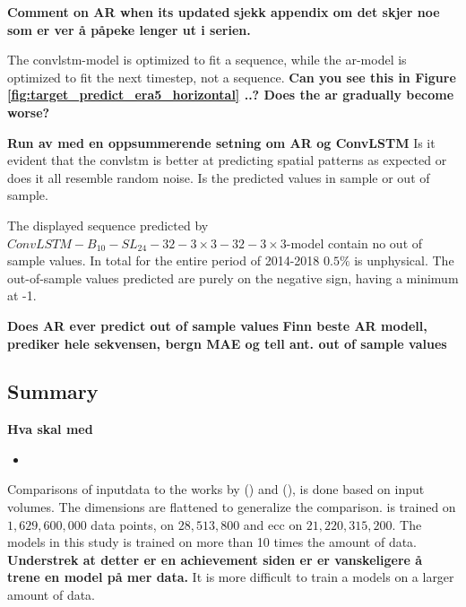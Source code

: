 \textbf{Comment on AR when its updated}
\textbf{sjekk appendix om det skjer noe som er ver å påpeke lenger ut i serien.}

The \acrshort{convlstm}-model is optimized to fit a sequence, while the \acrshort{ar}-model is optimized to fit the next timestep, not a sequence.
\textbf{Can you see this in Figure \ref{fig:target_predict_era5_horizontal} ..? Does the ar gradually become worse?}

\textbf{Run av med en oppsummerende setning om AR og ConvLSTM}
Is it evident that the \acrshort{convlstm} is better at predicting spatial patterns as expected or does it all resemble random noise. Is the predicted values in sample or out of sample.

The displayed sequence predicted by $ConvLSTM-B_{10}-SL_{24}-32-3\times3-32-3 \times3$-model contain no out of sample values. In total for the entire period of 2014-2018 $0.5\%$ is unphysical. The out-of-sample values predicted are purely on the negative sign, having a minimum at -1. 

\textbf{Does AR ever predict out of sample values}
\textbf{Finn beste AR modell, prediker hele sekvensen, bergn MAE og tell ant. out of sample values}

\subsection{Summary} \label{sec:summary_num}
\textbf{Hva skal med}
\begin{itemize}
    \item 
\end{itemize}

Comparisons of inputdata to the works by \citeauthor{precip_nowcasting} (\citeyear{precip_nowcasting}) and \citeauthor{SunAirLSTM} (\citeyear{SunAirLSTM}), is done based on input volumes. %
The dimensions are flattened to generalize the comparison.  is trained on $1,629,600,000$ data points,  on $28,513,800$ and \acrshort{ecc} on $21,220,315,200$. The models in this study is trained on more than 10 times the amount of data. \textbf{Understrek at detter er en achievement siden er er vanskeligere å trene en model på mer data.}
It is more difficult to train a models on a larger amount of data. 



\clearpage
